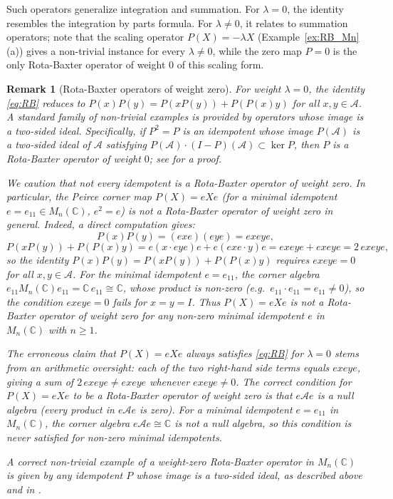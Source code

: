 \documentclass[10pt]{amsart}
\newcommand{\Ac}{\mathcal{A}}
\numberwithin{equation}{section}
\newtheorem{remark}[theorem]{Remark}
\begin{document}
Such operators generalize integration and summation. For \(\lambda=0\), the identity
resembles the integration by parts formula. For \(\lambda \neq 0\), it relates to
summation operators; note that the scaling operator $P(X) = -\lambda X$
(Example~\ref{ex:RB_Mn}(a)) gives a non-trivial instance for every $\lambda \neq 0$,
while the zero map $P = 0$ is the only Rota-Baxter operator of weight $0$ of this
scaling form.

\begin{remark}[Rota-Baxter operators of weight zero]\label{rem:RB_weight_zero}
For weight $\lambda = 0$, the identity \eqref{eq:RB} reduces to
$P(x)P(y) = P(xP(y)) + P(P(x)y)$ for all $x,y \in \Ac$.
A standard family of non-trivial examples is provided by operators whose image is a
two-sided ideal. Specifically, if $P^2 = P$ is an idempotent whose image $P(\Ac)$ is
a two-sided ideal of $\Ac$ satisfying $P(\Ac)\cdot(I-P)(\Ac) \subset \ker P$, then $P$
is a Rota-Baxter operator of weight $0$; see \cite{BaiGuoNi2011} for a proof.

We caution that not every idempotent is a Rota-Baxter operator of weight zero. In
particular, the Peirce corner map $P(X) = eXe$ (for a minimal idempotent
$e = e_{11} \in M_n(\mathbb{C})$, $e^2 = e$) is \emph{not} a Rota-Baxter operator
of weight zero in general. Indeed, a direct computation gives:
\[
  P(x)P(y) = (exe)(eye) = exeye,
\]
\[
  P(xP(y)) + P(P(x)y) = e(x\cdot eye)e + e(exe\cdot y)e = exeye + exeye = 2\,exeye,
\]
so the identity $P(x)P(y) = P(xP(y)) + P(P(x)y)$ requires $exeye = 0$ for all
$x, y \in \Ac$. For the minimal idempotent $e = e_{11}$, the corner algebra
$e_{11}M_n(\mathbb{C})e_{11} = \mathbb{C}\, e_{11} \cong \mathbb{C}$, whose product
is non-zero (e.g.\ $e_{11}\cdot e_{11} = e_{11} \neq 0$), so the condition $exeye=0$
fails for $x = y = I$. Thus $P(X)=eXe$ is not a Rota-Baxter operator of weight zero
for any non-zero minimal idempotent $e$ in $M_n(\mathbb{C})$ with $n\geq 1$.

The erroneous claim that $P(X)=eXe$ always satisfies \eqref{eq:RB} for $\lambda=0$
stems from an arithmetic oversight: each of the two right-hand side terms equals
$exeye$, giving a sum of $2\,exeye \neq exeye$ whenever $exeye \neq 0$.
The correct condition for $P(X)=eXe$
to be a Rota-Baxter operator of weight zero is that $e\Ac e$ is a null algebra (every
product in $e\Ac e$ is zero). For a minimal idempotent $e=e_{11}$ in $M_n(\mathbb{C})$,
the corner algebra $e\Ac e \cong \mathbb{C}$ is not a null algebra, so this condition
is never satisfied for non-zero minimal idempotents.

A correct non-trivial example of a weight-zero Rota-Baxter operator in $M_n(\mathbb{C})$
is given by any idempotent $P$ whose image is a two-sided ideal, as described above and
in \cite{BaiGuoNi2011}.
\end{remark}
\end{document}
